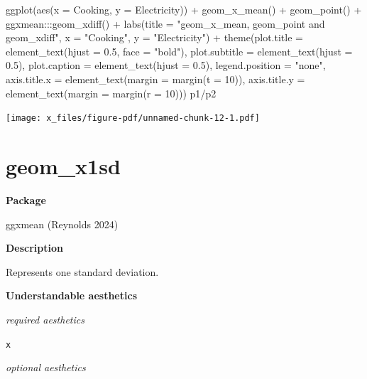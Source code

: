 \documentclass[
  letterpaper,
  DIV=11,
  numbers=noendperiod]{scrreprt}
\newenvironment{Shaded}{\begin{snugshade}}{\end{snugshade}}
\newcommand{\AttributeTok}[1]{\textcolor[rgb]{0.40,0.45,0.13}{#1}}
\newcommand{\DecValTok}[1]{\textcolor[rgb]{0.68,0.00,0.00}{#1}}
\newcommand{\FloatTok}[1]{\textcolor[rgb]{0.68,0.00,0.00}{#1}}
\newcommand{\FunctionTok}[1]{\textcolor[rgb]{0.28,0.35,0.67}{#1}}
\newcommand{\NormalTok}[1]{\textcolor[rgb]{0.00,0.23,0.31}{#1}}
\newcommand{\SpecialCharTok}[1]{\textcolor[rgb]{0.37,0.37,0.37}{#1}}
\newcommand{\StringTok}[1]{\textcolor[rgb]{0.13,0.47,0.30}{#1}}
\begin{document}
\begin{Shaded}
\begin{Highlighting}[]
  \FunctionTok{ggplot}\NormalTok{(}\FunctionTok{aes}\NormalTok{(}\AttributeTok{x =}\NormalTok{ Cooking, }\AttributeTok{y =}\NormalTok{ Electricity)) }\SpecialCharTok{+} \FunctionTok{geom\_x\_mean}\NormalTok{() }\SpecialCharTok{+}
  \FunctionTok{geom\_point}\NormalTok{() }\SpecialCharTok{+}\NormalTok{ ggxmean}\SpecialCharTok{:::}\FunctionTok{geom\_xdiff}\NormalTok{() }\SpecialCharTok{+}
  \FunctionTok{labs}\NormalTok{(}\AttributeTok{title =} \StringTok{"geom\_x\_mean, geom\_point and geom\_xdiff"}\NormalTok{, }\AttributeTok{x =} \StringTok{"Cooking"}\NormalTok{, }\AttributeTok{y =} \StringTok{"Electricity"}\NormalTok{) }\SpecialCharTok{+}
  \FunctionTok{theme}\NormalTok{(}\AttributeTok{plot.title =} \FunctionTok{element\_text}\NormalTok{(}\AttributeTok{hjust =} \FloatTok{0.5}\NormalTok{, }\AttributeTok{face =} \StringTok{"bold"}\NormalTok{),}
        \AttributeTok{plot.subtitle =} \FunctionTok{element\_text}\NormalTok{(}\AttributeTok{hjust =} \FloatTok{0.5}\NormalTok{),}
        \AttributeTok{plot.caption =} \FunctionTok{element\_text}\NormalTok{(}\AttributeTok{hjust =} \FloatTok{0.5}\NormalTok{), }\AttributeTok{legend.position =} \StringTok{"none"}\NormalTok{,}
        \AttributeTok{axis.title.x =} \FunctionTok{element\_text}\NormalTok{(}\AttributeTok{margin =} \FunctionTok{margin}\NormalTok{(}\AttributeTok{t =} \DecValTok{10}\NormalTok{)),}
        \AttributeTok{axis.title.y =} \FunctionTok{element\_text}\NormalTok{(}\AttributeTok{margin =} \FunctionTok{margin}\NormalTok{(}\AttributeTok{r =} \DecValTok{10}\NormalTok{)))}
\NormalTok{p1}\SpecialCharTok{/}\NormalTok{p2}
\end{Highlighting}
\end{Shaded}

\texttt{[image: x\_files/figure-pdf/unnamed-chunk-12-1.pdf]}

\section{geom\_x1sd}\label{x1sd}

\textbf{Package}

ggxmean (Reynolds 2024)

\textbf{Description}

Represents one standard deviation.

\textbf{Understandable aesthetics}

\emph{required aesthetics}

\texttt{x}

\emph{optional aesthetics}
\end{document}
